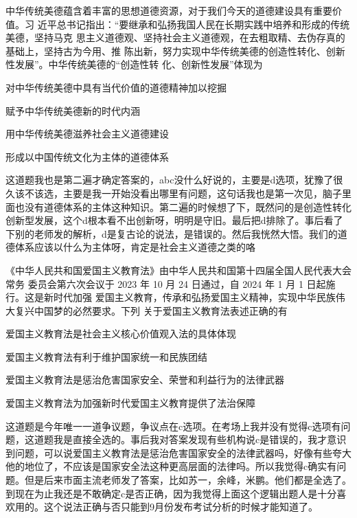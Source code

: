 \documentclass[lang=cn,blue,10pt,scheme=chinese,twocol]{zznote}
\begin{document}
\begin{exercise}中华传统美德蕴含着丰富的思想道德资源，对于我们今天的道德建设具有重要价值。习 近平总书记指出：“要继承和弘扬我国人民在长期实践中培养和形成的传统美德，坚持马克 思主义道德观、坚持社会主义道德观，在去粗取精、去伪存真的基础上，坚持古为今用、推 陈出新，努力实现中华传统美德的创造性转化、创新性发展”。中华传统美德的“创造性转 化、创新性发展”体现为
	\begin{choice}
		\item 对中华传统美德中具有当代价值的道德精神加以挖掘
		\item 赋予中华传统美德新的时代内涵
		\item 用中华传统美德滋养社会主义道德建设
		\item 形成以中国传统文化为主体的道德体系
	\end{choice}
\end{exercise}
\begin{solution}
	这道题我也是第二遍才确定答案的，abc没什么好说的，主要是d选项，犹豫了很久该不该选，主要是我一开始没看出哪里有问题，这句话我也是第一次见，脑子里面也没有道德体系的主体这种知识。第二遍的时候想了下，既然问的是创造性转化创新型发展，这个d根本看不出创新呀，明明是守旧。最后把d排除了。事后看了下别的老师发的解析，d是复古论的说法，是错误的。然后我恍然大悟。我们的道德体系应该以什么为主体呀，肯定是社会主义道德之类的咯~
\end{solution}


\begin{exercise} 《中华人民共和国爱国主义教育法》由中华人民共和国第十四届全国人民代表大会常务 委员会第六次会议于 2023 年 10 月 24 日通过，自 2024 年 1 月 1 日起施行。这是新时代加强 爱国主义教育，传承和弘扬爱国主义精神，实现中华民族伟大复兴中国梦的必然要求。下列 关于爱国主义教育法表述正确的有
	\begin{choice}
		\item 爱国主义教育法是社会主义核心价值观入法的具体体现
		\item 爱国主义教育法有利于维护国家统一和民族团结
		\item 爱国主义教育法是惩治危害国家安全、荣誉和利益行为的法律武器
		\item 爱国主义教育法为加强新时代爱国主义教育提供了法治保障
	\end{choice}
\end{exercise}
\begin{solution}
	这道题是今年唯一一道争议题，争议点在c选项。在考场上我并没有觉得c选项有问题，这道题我是直接全选的。事后我对答案发现有些机构说c是错误的，我才意识到问题，可以说爱国主义教育法是惩治危害国家安全的法律武器吗，好像有些夸大他的地位了，不应该是国家安全法这种更高层面的法律吗。所以我觉得c确实有问题。但是后来市面主流老师发了答案，比如苏一，余峰，米鹏。他们都是全选了。到现在为止我还是不敢确定c是否正确，因为我觉得上面这个逻辑出题人是十分喜欢用的。这个说法正确与否只能到9月份发布考试分析的时候才能知道了。
\end{solution}
\begin{note}

\end{note}
\end{document}
